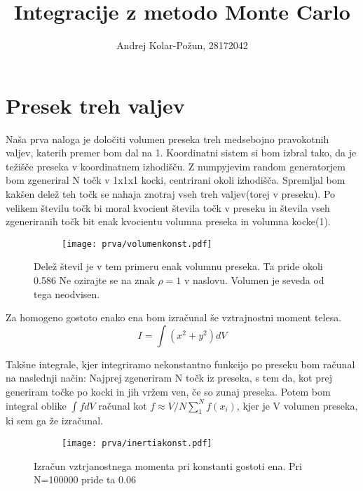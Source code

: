 \documentclass{article}
\title{Integracije z metodo Monte Carlo}
\author{Andrej Kolar-Požun, 28172042}
\begin{document}
\maketitle
\newpage
{}
\section{Presek treh valjev}

Naša prva naloga je določiti volumen preseka treh medsebojno pravokotnih valjev, katerih premer bom dal na 1.
Koordinatni sistem si bom izbral tako, da je težišče preseka v koordinatnem izhodišču.
Z numpyjevim random generatorjem bom zgeneriral N točk v 1x1x1 kocki, centrirani okoli izhodišča. Spremljal bom kakšen delež teh točk se nahaja znotraj vseh treh valjev(torej v preseku). Po velikem številu točk bi moral kvocient števila točk v preseku in števila vseh zgeneriranih točk bit enak kvocientu volumna preseka in volumna kocke(1).

\begin{figure}[H]
\centering
\begin{subfigure}{.7\textwidth}
\texttt{[image: prva/volumenkonst.pdf]}
\end{subfigure}
\caption*{Delež števil je v tem primeru enak volumnu preseka. Ta pride okoli 0.586 Ne ozirajte se na znak $\rho=1$ v naslovu. Volumen je seveda od tega neodvisen.}
\end{figure}

Za homogeno gostoto enako ena bom izračunal še vztrajnostni moment telesa.
\begin{equation*}
I = \int(x^2 + y^2)dV
\end{equation*}

Takšne integrale, kjer integriramo nekonstantno funkcijo po preseku bom računal na naslednji način:
Najprej zgeneriram N točk iz preseka, s tem da, kot prej generiram točke po kocki in jih vržem ven, če so zunaj preseka. Potem bom integral oblike $\int f dV$ računal kot $f \approx V  /N \sum_1^N f(x_i)$, kjer je V volumen preseka, ki sem ga že izračunal. 

\begin{figure}[H]
\centering
\begin{subfigure}{.7\textwidth}
\texttt{[image: prva/inertiakonst.pdf]}
\end{subfigure}
\caption*{Izračun vztrjanostnega momenta pri konstanti gostoti ena. Pri N=100000 pride ta $0.06$}
\end{figure}
\end{document}
